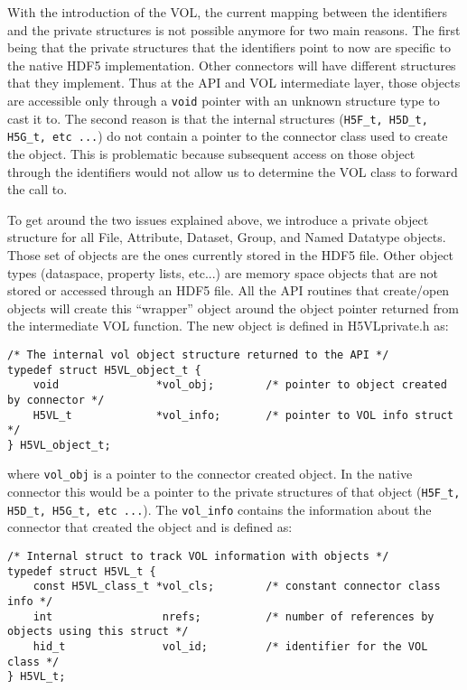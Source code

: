 With the introduction of the VOL, the current mapping between the identifiers and the private structures is not possible anymore for two main reasons. The first being that the private structures that the identifiers point to now are specific to the native HDF5 implementation. Other connectors will have different structures that they implement. Thus at the API and VOL intermediate layer, those objects are accessible only through a {\tt void} pointer with an unknown structure type to cast it to. The second reason is that the internal structures ({\tt H5F\_t, H5D\_t, H5G\_t,  etc ...}) do not contain a pointer to the connector class used to create the object. This is problematic because subsequent access on those object through the identifiers would not allow us to determine the VOL class to forward the call to.

To get around the two issues explained above, we introduce a private object structure for all File, Attribute, Dataset, Group, and Named Datatype objects. Those set of objects are the ones currently stored in the HDF5 file. Other object types (dataspace, property lists, etc...) are memory space objects that are not stored or accessed through an HDF5 file. All the API routines that create/open objects will create this ``wrapper'' object around the object pointer returned from the intermediate VOL function.  The new object is defined in {H5VLprivate.h} as:

\begin{lstlisting}
/* The internal vol object structure returned to the API */
typedef struct H5VL_object_t {
    void               *vol_obj;        /* pointer to object created by connector */
    H5VL_t             *vol_info;       /* pointer to VOL info struct */
} H5VL_object_t;
\end{lstlisting}

where {\tt vol\_obj} is a pointer to the connector created object. In the native connector this would be a pointer to the private structures of that object ({\tt H5F\_t, H5D\_t, H5G\_t,  etc ...}). The {\tt vol\_info} contains the information about the connector that created the object and is defined as:

\begin{lstlisting}
/* Internal struct to track VOL information with objects */
typedef struct H5VL_t {
    const H5VL_class_t *vol_cls;        /* constant connector class info */
    int                 nrefs;          /* number of references by objects using this struct */
    hid_t               vol_id;         /* identifier for the VOL class */
} H5VL_t;
\end{lstlisting}

